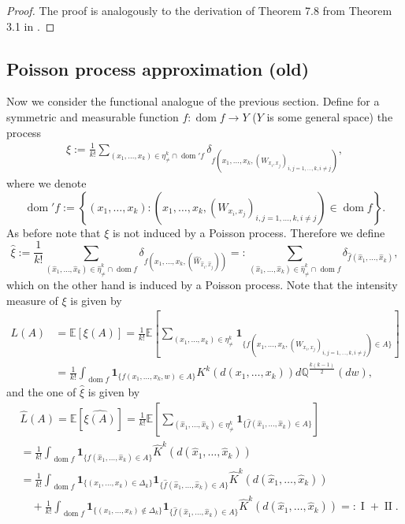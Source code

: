 \documentclass{article}
\theoremstyle{definition}
\numberwithin{equation}{section}
\theoremstyle{remark}
\begin{document}
\begin{proof}
The proof is analogously to the derivation of Theorem 7.8 from Theorem 3.1 in \cite{dst}. 
\end{proof}
\fi

\iffalse\subsection{Poisson process approximation (old)}
Now we consider the functional analogue of the previous section. Define for a symmetric and measurable function $f\colon \operatorname{dom} f \to Y$ ($Y$ is some general space) the process
\begin{align}\label{originalPproc}
     \xi:= \frac{1}{k!}\sum_{(x_1, \ldots, x_k) \in \eta^k_{\neq}\cap  {\operatorname{dom}'} f} \delta_{f \left( x_1, \ldots, x_k, (W_{x_i,x_j})_{i,j =1,\ldots, k, i \neq j} \right)} ,
 \end{align}
where we denote
$${\operatorname{dom}'} f := \left\{( x_1, \ldots, x_k) : \left( x_1, \ldots, x_k, (W_{x_i,x_j})_{i,j =1,\ldots, k, i \neq j} \right) \in  \operatorname{dom} f\right\} . $$
As before note that $\xi$ is not induced by a Poisson process. Therefore we define
$$ \hat{\xi}:= \frac{1}{k!}\sum_{(\hat{x}_1, \ldots, \hat{x}_k) \in \hat{\eta}^k_{\neq} \cap  \operatorname{dom} f} \delta_{f \left( {x}_1, \ldots, {x}_k, (\hat{W}_{\hat{x}_i,\hat{x}_j}) \right)} =:  \sum_{(\hat{x}_1, \ldots, \hat{x}_k) \in \hat{\eta}^k_{\neq}\cap  \operatorname{dom} f} \delta_{\hat{f} ( \hat{x}_1, \ldots, \hat{x}_k )},$$
which on the other hand is induced by a Poisson process. Note that the intensity measure of $\xi$ is given by
\begin{align*}
    L(A) & = \mathbb{E}[\xi(A)] = \frac{1}{k!} \mathbb{E}\left[ \sum_{(x_1, \ldots, x_k) \in \eta^k_{\neq}} \mathbf{1}_{\{ f(x_1, \ldots, x_k, (W_{x_i,x_j})_{i,j =1,\ldots, k, i \neq j}) \in A\}}\right] \\
    & = \frac{1}{k!}  \int_{\operatorname{dom} f}  \mathbf{1}_{\{ f(x_1, \ldots, x_k, w) \in A\}} K^k(d(x_1, \ldots, x_k)) d\mathbb{Q}^{\frac{k (k-1)}{2}} (dw),
\end{align*}
and the one of $\hat{\xi}$ is given by
\begin{align*}
    &\hat{L}(A)  = \mathbb{E}[\hat{\xi(A)}] = \frac{1}{k!} \mathbb{E}\left[ \sum_{(\hat{x}_1, \ldots, \hat{x}_k) \in \eta^k_{\neq}} \mathbf{1}_{\{ \hat{f}(\hat{x}_1, \ldots, \hat{x}_k) \in A\}}\right] \\
    & = \frac{1}{k!}  \int_{\operatorname{dom} f}  \mathbf{1}_{\{  \hat{f}(\hat{x}_1, \ldots, \hat{x}_k) \in A\}} \hat{K}^k(d(\hat{x}_1, \ldots, \hat{x}_k)) \\
    &  = \frac{1}{k!}  \int_{\operatorname{dom} f} \mathbf{1}_{\{  ( {x}_1, \ldots, {x}_k ) \in \Delta_{k} \} }  \mathbf{1}_{\{  \hat{f}(\hat{x}_1, \ldots, \hat{x}_k) \in A\}} \hat{K}^k(d(\hat{x}_1, \ldots, \hat{x}_k)) \\
    & \quad +  \frac{1}{k!}  \int_{\operatorname{dom} f} \mathbf{1}_{\{  ( {x}_1, \ldots, {x}_k ) \notin \Delta_{k} \} }  \mathbf{1}_{\{  \hat{f}(\hat{x}_1, \ldots, \hat{x}_k) \in A\}} \hat{K}^k(d(\hat{x}_1, \ldots, \hat{x}_k))
    =: \operatorname{I} +  \operatorname{II} .
\end{align*}
\end{document}
